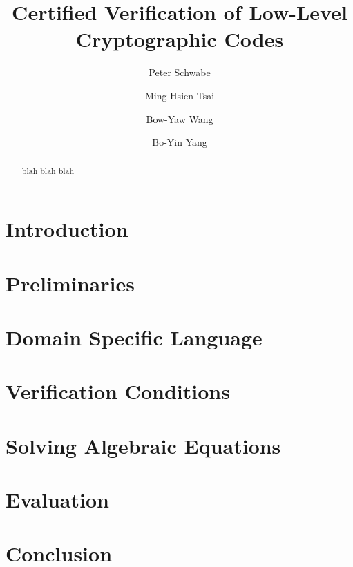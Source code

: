 \documentclass{llncs}
\title{Certified Verification of Low-Level Cryptographic Codes}
\author{
Peter Schwabe\inst{2}
\and
Ming-Hsien Tsai\inst{1}
\and
Bow-Yaw Wang\inst{1}
\and
Bo-Yin Yang\inst{1}
%
}
\institute
{
Institute of Information Science\\
Academia Sinica\\
128 Section 2 Academia Road, Taipei 115-29, Taiwan\\
\email{mhtsai208@gmail.com, bywang@iis.sinica.edu.tw, by@crypto.tw}
\and
Radboud University Nijmegen\\
Digital Security Group\\
PO Box 9010, 6500GL Nijmegen, The Netherlands\\
\email{peter@cryptojedi.org}
}
\author{\vspace*{-1cm} }
\institute{\vspace*{-1cm}\ }
\begin{document}
\maketitle

\begin{abstract}
  blah blah blah
\end{abstract}

\section{Introduction}
\label{section:introduction}


\section{Preliminaries}
\label{section:preliminaries}


\section{Domain Specific Language -- }
\label{section:domain-specific-language}


\section{Verification Conditions}
\label{section:translation}


\section{Solving Algebraic Equations}
\label{section:solving-algebraic-equations}


\section{Evaluation}
\label{section:evaluation}


\section{Conclusion}
\label{section:conclusion}



%


\end{document}
